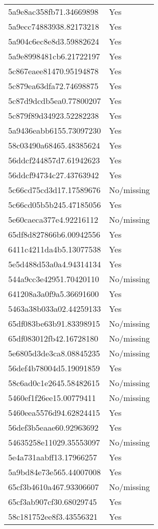 \begin{tabular}{ll}
5a9e8ac358fb71.34669898 & Yes \\
5a9ecc74883938.82173218 & Yes \\
5a904c6ec8e8d3.59882624 & Yes \\
5a9e8998481cb6.21722197 & Yes \\
5c867eaee81470.95194878 & Yes \\
5c879ea63dfa72.74698875 & Yes \\
5c87d9dcdb5ea0.77800207 & Yes \\
5c879f89d34923.52282238 & Yes \\
5a9436eabb6155.73097230 & Yes \\
58c03490a68465.48385624 & Yes \\
56ddcf244857d7.61942623 & Yes \\
56ddcf94734c27.43763942 & Yes \\
5c66cd75cd3d17.17589676 & No/missing \\
5c66cd05b5b245.47185056 & Yes \\
5e60caeca377e4.92216112 & No/missing \\
65df8d827866b6.00942556 & Yes \\
6411c4211da4b5.13077538 & Yes \\
5e5d488d53a0a4.94314134 & Yes \\
544a9cc3e42951.70420110 & No/missing \\
641208a3a0f9a5.36691600 & Yes \\
5463a38b033a02.44259133 & Yes \\
65df083be63b91.83398915 & No/missing \\
65df083012fb42.16728180 & No/missing \\
5e6805d3de3ca8.08845235 & No/missing \\
56def4b78004d5.19091859 & Yes \\
58c6ad0c1e2645.58482615 & No/missing \\
5460ef1f26ee15.00779411 & No/missing \\
5460eea5576d94.62824415 & Yes \\
56def3b5eaae60.92963692 & Yes \\
54635258e11029.35553097 & No/missing \\
5e4a731aabff13.17966257 & Yes \\
5a9bd84e73e565.44007008 & Yes \\
65cf3b4610a467.93306607 & No/missing \\
65cf3ab907cf30.68029745 & Yes \\
58c181752ee8f3.43556321 & Yes \\

\end{tabular}
